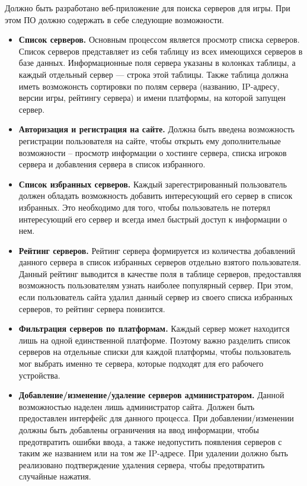Должно быть разработано веб-приложение для поиска серверов для игры. При этом ПО должно содержать в себе следующие возможности.

\begin{itemize}
    \item \textbf{Список серверов.} Основным процессом является просмотр списка серверов. Список серверов представляет из себя таблицу из всех имеющихся серверов в базе данных. Информационные поля сервера указаны в колонках таблицы, а каждый отдельный сервер --- строка этой таблицы. Также таблица должна иметь возможонсть сортировки по полям сервера (названию, IP-адресу, версии игры, рейтингу сервера) и имени платформы, на которой запущен сервер.

    \item \textbf{Авторизация и регистрация на сайте.} Должна быть введена возможность регистрации пользователя на сайте, чтобы открыть ему дополнительные возможности -- просмотр информации о хостинге сервера, списка игроков сервера и добавления сервера в список избранного.

    \item \textbf{Список избранных серверов.} Каждый зарегестрированный пользователь должен обладать возможность добавить интересующий его сервер в список избранных. Это необходимо для того, чтобы пользователь не потерял интересующий его сервер и всегда имел быстрый доступ к информации о нем.

    \item \textbf{Рейтинг серверов.} Рейтинг сервера формируется из количества добавлений данного сервера в список избранных серверов отдельно взятого пользователя. Данный рейтинг выводится в качестве поля в таблице серверов, предоставляя возможность пользователям узнать наиболее популярный сервер. При этом, если пользователь сайта удалил данный сервер из своего списка избранных серверов, то рейтинг сервера понизится.

    \item \textbf{Фильтрация серверов по платформам.} Каждый сервер может находится лишь на одной единственной платформе. Поэтому важно разделить список серверов на отдельные списки для каждой платформы, чтобы пользователь мог выбрать именно те сервера, которые подходят для его рабочего устройства.

    \item \textbf{Добавление/изменение/удаление серверов администратором.} Данной возможностью наделен лишь администратор сайта. Должен быть предоставлен интерфейс для данного процесса. При добавлении/изменении должны быть добавлены ограничения на ввод информации, чтобы предотвратить ошибки ввода, а также недопустить появления серверов с таким же названием или на том же IP-адресе. При удалении должно быть реализовано подтверждение удаления сервера, чтобы предотвратить случайные нажатия.


\end{itemize}
